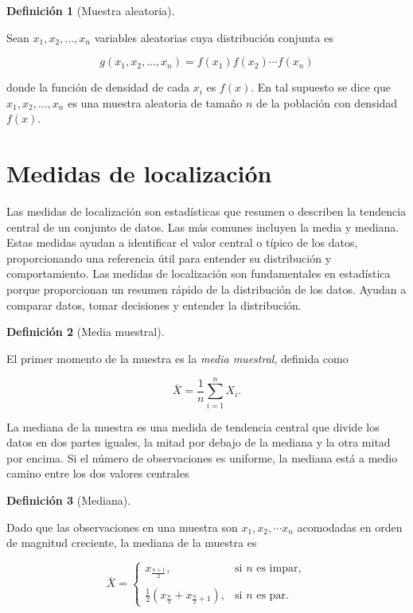 \documentclass[
  us-letterpaper,
]{scrreprt}
\theoremstyle{plain}
\theoremstyle{plain}
\theoremstyle{definition}
\newtheorem{definition}{Definición}[chapter]
\theoremstyle{remark}
\begin{document}
\begin{definition}[Muestra
aleatoria]\protect\hypertarget{def-muestra_aleatoria}{}\label{def-muestra_aleatoria}

Sean \(x_1, x_2, ..., x_n\) variables aleatorias cuya distribución
conjunta es

\[
g(x_1, x_2, ..., x_n) = f(x_1) f(x_2)\dotsb f(x_n)
\]

donde la función de densidad de cada \(x_i\) es \(f(x)\). En tal
supuesto se dice que \(x_1, x_2, ..., x_n\) es una muestra aleatoria de
tamaño \(n\) de la población con densidad \(f(x)\).

\end{definition}

\section{Medidas de localización}\label{medidas-de-localizaciuxf3n}

Las medidas de localización son estadísticas que resumen o describen la
tendencia central de un conjunto de datos. Las más comunes incluyen la
media y mediana. Estas medidas ayudan a identificar el valor central o
típico de los datos, proporcionando una referencia útil para entender su
distribución y comportamiento. Las medidas de localización son
fundamentales en estadística porque proporcionan un resumen rápido de la
distribución de los datos. Ayudan a comparar datos, tomar decisiones y
entender la distribución.

\begin{definition}[Media
muestral]\protect\hypertarget{def-media}{}\label{def-media}

El primer momento de la muestra es la \emph{media muestral}, definida
como

\[\bar{X} = \frac{1}{n} \sum_{i=1}^n X_i.\]

\end{definition}

La mediana de la muestra es una medida de tendencia central que divide
los datos en dos partes iguales, la mitad por debajo de la mediana y la
otra mitad por encima. Si el número de observaciones es uniforme, la
mediana está a medio camino entre los dos valores centrales

\begin{definition}[Mediana]\protect\hypertarget{def-mediana}{}\label{def-mediana}

Dado que las observaciones en una muestra son \(x_1, x_2, \cdots x_n\)
acomodadas en orden de magnitud creciente, la mediana de la muestra es

\[
\bar{X} = \left\{ \begin{array}{lcc} x_{\frac{n+1}{2}}, & \text{si $n$ es impar}, \\ \\ \frac{1}{2}(x_{\frac{n}{2}} + x_{\frac{n}{2}+1}), & \text{si $n$ es par}. \end{array} \right.
\]

\end{definition}
\end{document}
